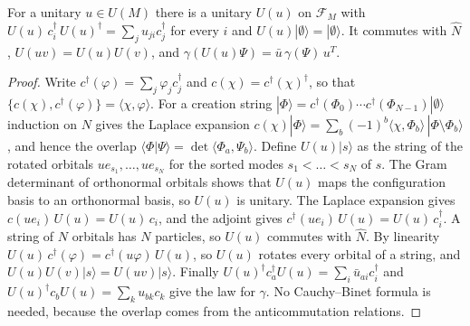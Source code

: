 \begin{definition}\label{def:mode-rotation}
  \leanok
  For a unitary $u\in U(M)$ there is a unitary $U(u)$ on $\mathcal F_M$ with $U(u)\,c_i^\dagger\,U(u)^\dagger=\sum_ju_{ji}c_j^\dagger$
  for every $i$ and $U(u)|\emptyset\rangle=|\emptyset\rangle$. It commutes with $\hat N$, $U(uv)=U(u)U(v)$, and
  $\gamma(U(u)\Psi)=\bar u\,\gamma(\Psi)\,u^{T}$.
\end{definition}
\begin{proof}\leanok
  Write $c^\dagger(\varphi)=\sum_j\varphi_jc_j^\dagger$ and $c(\chi)=c^\dagger(\chi)^\dagger$, so that
  $\{c(\chi),c^\dagger(\varphi)\}=\langle\chi,\varphi\rangle$. For a creation string
  $|\Phi\rangle=c^\dagger(\Phi_0)\cdots c^\dagger(\Phi_{N-1})|\emptyset\rangle$ induction on $N$ gives the Laplace expansion
  $c(\chi)|\Phi\rangle=\sum_b(-1)^b\langle\chi,\Phi_b\rangle\,|\Phi\setminus\Phi_b\rangle$, and hence the overlap
  $\langle\Phi|\Psi\rangle=\det\langle\Phi_a,\Psi_b\rangle$. Define $U(u)|s\rangle$ as the string of the rotated orbitals
  $ue_{s_1},\dots,ue_{s_N}$ for the sorted modes $s_1<\dots<s_N$ of $s$. The Gram determinant of orthonormal orbitals
  shows that $U(u)$ maps the configuration basis to an orthonormal basis, so $U(u)$ is unitary. The Laplace expansion
  gives $c(ue_i)\,U(u)=U(u)\,c_i$, and the adjoint gives $c^\dagger(ue_i)\,U(u)=U(u)\,c_i^\dagger$. A string of $N$ orbitals
  has $N$ particles, so $U(u)$ commutes with $\hat N$. By linearity $U(u)\,c^\dagger(\varphi)=c^\dagger(u\varphi)\,U(u)$,
  so $U(u)$ rotates every orbital of a string, and $U(u)U(v)|s\rangle=U(uv)|s\rangle$. Finally
  $U(u)^\dagger c_a^\dagger U(u)=\sum_i\bar u_{ai}c_i^\dagger$ and $U(u)^\dagger c_bU(u)=\sum_ku_{bk}c_k$ give the law for $\gamma$.
  No Cauchy--Binet formula is needed, because the overlap comes from the anticommutation relations.
\end{proof}

